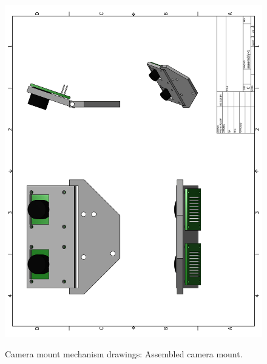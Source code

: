 \begin{figure}[ht!]
\begin{center}
\includegraphics[height=1.2\textwidth]{fig/cammountp1}\\
\caption{Camera mount mechanism drawings: Assembled camera mount.}
\label{fig_cammountp1}
\end{center}
\end{figure}
